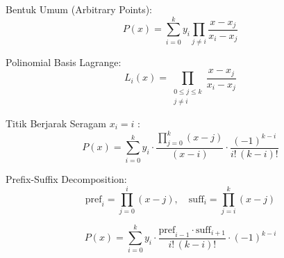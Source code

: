 Bentuk Umum (Arbitrary Points):
$$P(x) = \sum_{i = 0}^{k} y_i \prod_{j \neq i} \frac{x - x_j}{x_i - x_j}$$

Polinomial Basis Lagrange:
$$L_i(x) = \prod_{\substack{0 \le j \le k \\ j \neq i}} \frac{x - x_j}{x_i - x_j}$$

Titik Berjarak Seragam $x_i = i$ :
$$P(x) = \sum_{i = 0}^{k} y_i \cdot \frac{\prod_{j=0}^{k} (x - j)}{(x - i)} \cdot \frac{(-1)^{k - i}}{i! \, (k - i)!}$$

Prefix-Suffix Decomposition:
$$\text{pref}_i = \prod_{j = 0}^{i} (x - j), \quad \text{suff}_i = \prod_{j = i}^{k} (x - j)$$

$$P(x) = \sum_{i = 0}^{k} y_i \cdot \frac{\text{pref}_{i - 1} \cdot \text{suff}_{i + 1}}{i! \, (k - i)!} \cdot (-1)^{k - i}$$